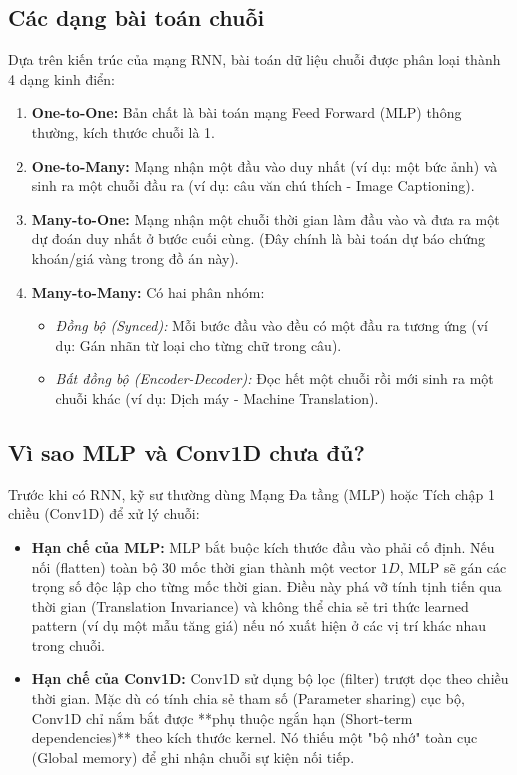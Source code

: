 \documentclass[12pt,a4paper]{article}
\begin{document}
\subsection{Các dạng bài toán chuỗi}
Dựa trên kiến trúc của mạng RNN, bài toán dữ liệu chuỗi được phân loại thành 4 dạng kinh điển:
\begin{enumerate}
    \item \textbf{One-to-One:} Bản chất là bài toán mạng Feed Forward (MLP) thông thường, kích thước chuỗi là 1.
    \item \textbf{One-to-Many:} Mạng nhận một đầu vào duy nhất (ví dụ: một bức ảnh) và sinh ra một chuỗi đầu ra (ví dụ: câu văn chú thích - Image Captioning).
    \item \textbf{Many-to-One:} Mạng nhận một chuỗi thời gian làm đầu vào và đưa ra một dự đoán duy nhất ở bước cuối cùng. (Đây chính là bài toán dự báo chứng khoán/giá vàng trong đồ án này).
    \item \textbf{Many-to-Many:} Có hai phân nhóm: 
        \begin{itemize}
            \item \textit{Đồng bộ (Synced):} Mỗi bước đầu vào đều có một đầu ra tương ứng (ví dụ: Gán nhãn từ loại cho từng chữ trong câu).
            \item \textit{Bất đồng bộ (Encoder-Decoder):} Đọc hết một chuỗi rồi mới sinh ra một chuỗi khác (ví dụ: Dịch máy - Machine Translation).
        \end{itemize}
\end{enumerate}

\subsection{Vì sao MLP và Conv1D chưa đủ?}
Trước khi có RNN, kỹ sư thường dùng Mạng Đa tầng (MLP) hoặc Tích chập 1 chiều (Conv1D) để xử lý chuỗi:
\begin{itemize}
    \item \textbf{Hạn chế của MLP:} MLP bắt buộc kích thước đầu vào phải cố định. Nếu nối (flatten) toàn bộ 30 mốc thời gian thành một vector $1D$, MLP sẽ gán các trọng số độc lập cho từng mốc thời gian. Điều này phá vỡ tính tịnh tiến qua thời gian (Translation Invariance) và không thể chia sẻ tri thức learned pattern (ví dụ một mẫu tăng giá) nếu nó xuất hiện ở các vị trí khác nhau trong chuỗi.
    \item \textbf{Hạn chế của Conv1D:} Conv1D sử dụng bộ lọc (filter) trượt dọc theo chiều thời gian. Mặc dù có tính chia sẻ tham số (Parameter sharing) cục bộ, Conv1D chỉ nắm bắt được **phụ thuộc ngắn hạn (Short-term dependencies)** theo kích thước kernel. Nó thiếu một "bộ nhớ" toàn cục (Global memory) để ghi nhận chuỗi sự kiện nối tiếp.
\end{itemize}
\end{document}
